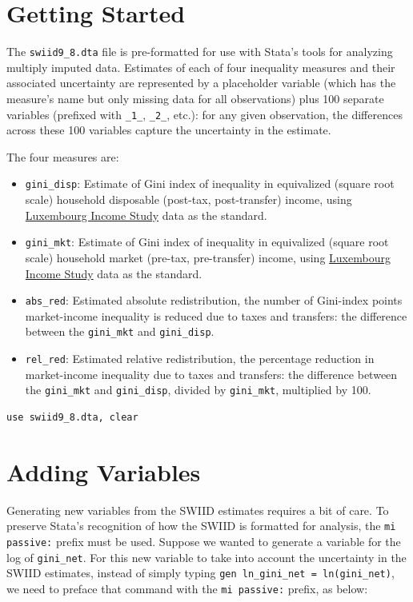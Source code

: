 \documentclass[11pt]{article}
\begin{document}
\section{Getting Started}
The \verb+swiid9_8.dta+ file is pre-formatted for use with Stata's tools for analyzing multiply imputed data.  Estimates of each of four inequality measures and their associated uncertainty are represented by a placeholder variable (which has the measure's name but only missing data for all observations) plus 100 separate variables (prefixed with \verb+_1_+, \verb+_2_+, etc.): for any given observation, the differences across these 100 variables capture the uncertainty in the estimate.   

The four measures are:
\begin{itemize}
	\item \verb+gini_disp+: Estimate of Gini index of inequality in equivalized (square root scale) household disposable (post-tax, post-transfer) income, using \href{http://www.lisdatacenter.org}{Luxembourg Income Study} data as the standard.
	\item \verb+gini_mkt+: Estimate of Gini index of inequality in equivalized (square root scale) household market (pre-tax, pre-transfer) income, using \href{http://www.lisdatacenter.org}{Luxembourg Income Study} data as the standard.	
	\item \verb+abs_red+: Estimated absolute redistribution, the number of Gini-index points market-income inequality is reduced due to taxes and transfers: the difference between the \verb+gini_mkt+ and \verb+gini_disp+.
	\item \verb+rel_red+: Estimated relative redistribution, the percentage reduction in market-income inequality due to taxes and transfers: the difference between the \verb+gini_mkt+ and \verb+gini_disp+, divided by \verb+gini_mkt+, multiplied by 100.
\end{itemize}

\begin{verbatim}
use swiid9_8.dta, clear
\end{verbatim}

\section{Adding Variables}
Generating new variables from the SWIID estimates requires a bit of care.  To preserve Stata's recognition of how the SWIID is formatted for analysis, the \verb+mi passive:+ prefix must be used.  Suppose we wanted to generate a variable for the log of \verb+gini_net+.  For this new variable to take into account the uncertainty in the SWIID estimates, instead of simply typing \verb+gen ln_gini_net = ln(gini_net)+, we need to preface that command with the \verb+mi passive:+ prefix, as below:
\end{document}
